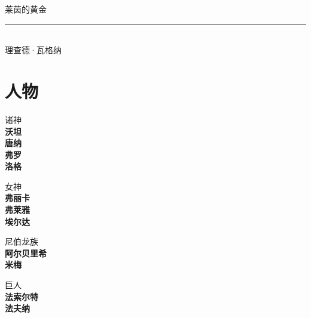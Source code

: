 \documentclass[10.5pt,openany]{ctexbook}
\begin{document}
\frontmatter
\begin{titlepage}
\thispagestyle{empty}
\vspace*{3.2cm}
\begin{center}
{\Huge 莱茵的黄金}\\[3.4ex]
{\color{rule}\rule{0.4\textwidth}{0.4pt}}\\[3.2ex]
{\large 理查德·瓦格纳}
\end{center}
\vfill
\end{titlepage}
\tableofcontents
{}
\mainmatter

\chapter*{人物}
\begin{center}
{\small\color{stage}诸神}\\[0.8ex]
\textbf{沃坦}\\[0.3ex]
\textbf{唐纳}\\[0.3ex]
\textbf{弗罗}\\[0.3ex]
\textbf{洛格}\\[0.3ex]
\par\vspace{1.0ex}
{\small\color{stage}女神}\\[0.8ex]
\textbf{弗丽卡}\\[0.3ex]
\textbf{弗莱雅}\\[0.3ex]
\textbf{埃尔达}\\[0.3ex]
\par\vspace{1.0ex}
{\small\color{stage}尼伯龙族}\\[0.8ex]
\textbf{阿尔贝里希}\\[0.3ex]
\textbf{米梅}\\[0.3ex]
\par\vspace{1.0ex}
{\small\color{stage}巨人}\\[0.8ex]
\textbf{法索尔特}\\[0.3ex]
\textbf{法夫纳}\\[0.3ex]
\par\vspace{1.0ex}

\end{center}
\end{document}
